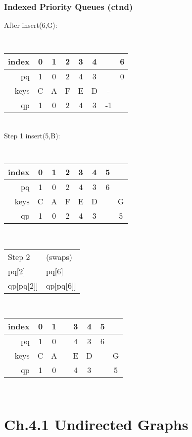 \documentclass[handout]{beamer}
\begin{document}
\begin{frame}
    \frametitle{Indexed Priority Queues (ctnd)}
After insert(6,G):\quad\quad
{\tt
\begin{tabular}{|r|c|c|c|c|c|c|c|}
\hline
index & 0&1&2&3&4&\color{red}{5}&6 \\\hline
pq    & 1&0&2&4&3&\color{red}{6}&0 \\\hline
keys  & C&A&F&E&D&-&\color{red}{G} \\\hline
qp    & 1&0&2&4&3&-1&\color{red}{5}\\\hline
\end{tabular}
}\\
Step 1 insert(5,B):\quad\quad
{\tt
\begin{tabular}{|r|c|c|c|c|c|c|c|}
\hline
index & 0&1&2&3&4&5&\color{red}{6} \\\hline
pq    & 1&0&2&4&3&6&\color{red}{5} \\\hline
keys  & C&A&F&E&D&\color{red}{B}&G \\\hline
qp    & 1&0&2&4&3&\color{red}{6}&5\\\hline
\end{tabular}
}\\
\begin{tabular}{ll}
Step 2 &(swaps)\\
pq[2]&pq[6]\\
qp[pq[2]] & qp[pq[6]]
\end{tabular}
{\tt
\begin{tabular}{|r|c|c|c|c|c|c|c|}
\hline
index & 0&1&\color{red}{2}&3&4&5&\color{red}{6} \\\hline
pq    & 1&0&\color{red}{5}&4&3&6&\color{red}{2} \\\hline
keys  & C&A&\color{red}{F}&E&D&\color{red}{B}&G \\\hline
qp    & 1&0&\color{red}{6}&4&3&\color{red}{2}&5\\\hline
\end{tabular}
}\\
\end{frame}


\section{Ch.4.1 Undirected Graphs}
\end{document}
